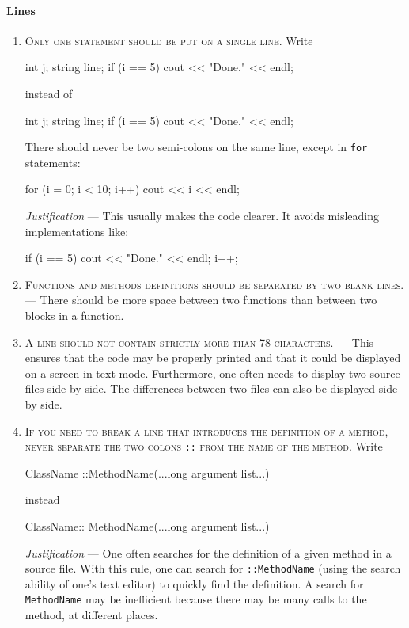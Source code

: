 \documentclass{tufte-book}
\newcounter{points}
\newcommand{\code}[1]{\texttt{#1}}
\renewcommand{\rule}[1]{\textsc{#1}}
\newcommand{\commentcs}[1]{\newline #1}
\newcommand{\commentf}[1]{#1}
\newcommand{\justification}[1]{\newline {\it Justification} --- #1}
\newcommand{\njustification}[1]{{\it Justification} --- #1}
\newenvironment{cenumerate}
{
  \begin{enumerate}\setcounter{enumi}{\value{points}}%
  }
  {
    \setcounter{points}{\value{enumi}}\end{enumerate}
}
\begin{document}
\paragraph{Lines}
\label{sec:lines}

\begin{cenumerate}
\item \rule{Only one statement should be put on a single line.}
  \commentcs{Write}
\begin{frame_cpp}
int j;
string line;
if (i == 5)
    cout << "Done." << endl;
\end{frame_cpp}
  \commentf{instead of}
\begin{frame_cpp}
int j; string line;
if (i == 5) cout << "Done." << endl;
\end{frame_cpp}
  \commentf{There should never be two semi-colons on the same line, except in
    \code{for} statements:}
\begin{frame_cpp}
for (i = 0; i < 10; i++)
    cout << i << endl;
\end{frame_cpp}
  \njustification{This usually makes the code clearer. It avoids misleading
    implementations like:}
\begin{frame_cpp}
if (i == 5)
    cout << "Done." << endl; i++;
\end{frame_cpp}
\item \rule{Functions and methods definitions should be separated by two blank
    lines.}  \justification{There should be more space between two functions
    than between two blocks in a function.}
\item \rule{A line should not contain strictly more than 78 characters.}
  \justification{This ensures that the code may be properly printed and that
    it could be displayed on a screen in text mode. Furthermore, one often
    needs to display two source files side by side. The differences between
    two files can also be displayed side by side.}
\item \rule{If you need to break a line that introduces the definition of a
    method, never separate the two colons \code{::} from the name of the
    method.} \commentcs{Write}
\begin{frame_cpp}
ClassName
::MethodName(...long argument list...)
\end{frame_cpp}
  \commentf{instead}
\begin{frame_cpp}
ClassName::
MethodName(...long argument list...)
\end{frame_cpp}
  \njustification{One often searches for the definition of a given method in a
    source file. With this rule, one can search for \code{::MethodName} (using
    the search ability of one's text editor) to quickly find the definition. A
    search for \code{MethodName} may be inefficient because there may be many
    calls to the method, at different places.}
\end{cenumerate}
\end{document}
